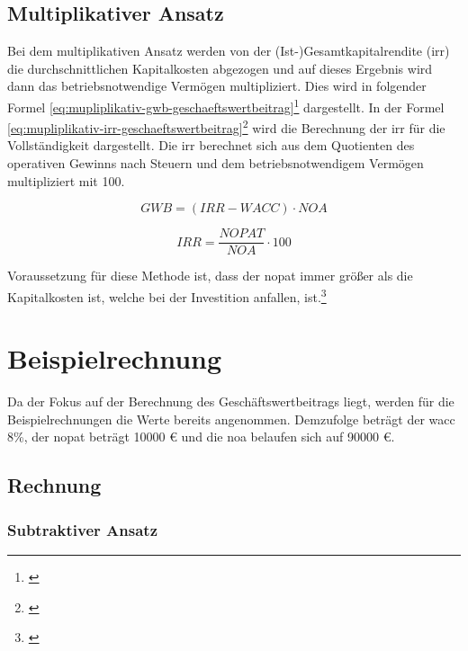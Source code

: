 \subsection{Multiplikativer Ansatz}

Bei dem multiplikativen Ansatz werden von der (Ist-)Gesamtkapitalrendite (\ac{irr}) die durchschnittlichen Kapitalkosten abgezogen und auf dieses Ergebnis wird dann das betriebsnotwendige Vermögen multipliziert. Dies wird in folgender Formel \eqref{eq:mupliplikativ-gwb-geschaeftswertbeitrag}\footnote{\cite{wikipedia-eva}} dargestellt. In der Formel \eqref{eq:mupliplikativ-irr-geschaeftswertbeitrag}\footnote{\cite{controllingportal-eva}} wird die Berechnung der \ac{irr} für die Vollständigkeit dargestellt. Die \ac{irr} berechnet sich aus dem Quotienten des operativen Gewinns nach Steuern und dem betriebsnotwendigem Vermögen multipliziert mit 100.

\begin{equation}
    GWB = (IRR - WACC) \cdot NOA
    \label{eq:mupliplikativ-gwb-geschaeftswertbeitrag}
\end{equation}

\begin{equation}
    IRR = \frac{NOPAT}{NOA} \cdot 100
    \label{eq:mupliplikativ-irr-geschaeftswertbeitrag}
\end{equation}

\bigskip

\noindent
Voraussetzung für diese Methode ist, dass der \ac{nopat} immer größer als die Kapitalkosten ist, welche bei der Investition anfallen, ist.\footnote{\cite{bwllexicon-eva}}

\section{Beispielrechnung}

Da der Fokus auf der Berechnung des Geschäftswertbeitrags liegt, werden für die Beispielrechnungen die Werte bereits angenommen. Demzufolge beträgt der \ac{wacc} 8\%, der \ac{nopat} beträgt 10000 € und die \ac{noa} belaufen sich auf 90000 €.

\subsection{Rechnung}

\subsubsection{Subtraktiver Ansatz}

